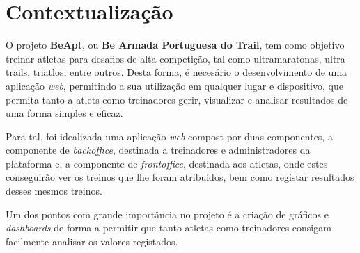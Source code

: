 \section{Contextualização}

O projeto \textbf{BeApt}, ou \textbf{Be Armada Portuguesa do Trail}, tem como objetivo treinar atletas para desafios de alta competição, tal como ultramaratonas, ultra-trails, triatlos, entre outros. Desta forma, é necesário o desenvolvimento de uma aplicação \textit{web}, permitindo a sua utilização em qualquer lugar e dispositivo, que permita tanto a atlets como treinadores gerir, visualizar e analisar resultados de uma forma simples e eficaz.

Para tal, foi idealizada uma aplicação \textit{web} compost por duas componentes, a componente de \textit{backoffice}, destinada a treinadores e administradores da plataforma e, a componente de \textit{frontoffice}, destinada aos atletas, onde estes conseguirão ver os treinos que lhe foram atribuídos, bem como registar resultados desses mesmos treinos.

Um dos pontos com grande importância no projeto é a criação de gráficos e \textit{dashboards} de forma a permitir que tanto atletas como treinadores consigam facilmente analisar os valores registados.